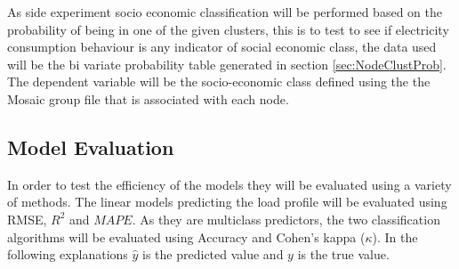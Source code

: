 As side experiment socio economic classification will be performed based on the probability of being in one of the given clusters, this is to test to see if electricity consumption behaviour is any indicator of social economic class, the data used will be the bi variate probability table generated in section \ref{sec:NodeClustProb}. The dependent variable will be the socio-economic class defined using the the Mosaic group file that is associated with each node. 


\subsection{Model Evaluation}
In order to test the efficiency of the models they will be evaluated using a variety of methods. The linear models predicting the load profile will be evaluated using RMSE, $R^2$ and $MAPE$. As they are multiclass predictors, the two classification algorithms will be evaluated using Accuracy and Cohen's kappa ($\kappa$). In the following explanations $\hat{y}$ is the predicted value and $y$ is the true value.

